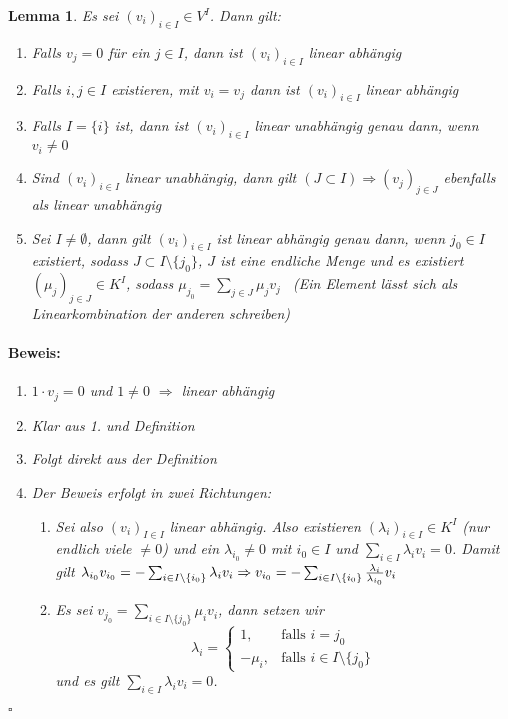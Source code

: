 \documentclass{report}
\newcommand{\lb}{\lambda}
\theoremstyle{customrem}
\theoremstyle{customdef}
\newtheorem{lemma}[definition]{Lemma}
\renewenvironment{proof}{\vspace{-.75cm}\paragraph{Beweis: }}{\vspace{-.5cm}\hfill$\square$}
\begin{document}
	\begin{lemma}
		\label{lem210}
		Es sei $(v_i)_{i \in I} \in V^I$. Dann gilt:
		\begin{enumerate}
			\itemsep.1cm
			\item Falls $v_j = 0$ für ein $j \in I$, dann ist $(v_i)_{i \in I}$ linear abhängig
			\item Falls $i, j \in I$ existieren, mit $v_i = v_j$ dann ist $(v_i)_{i \in I}$ linear abhängig
			\item Falls $I = \{i\}$ ist, dann ist $(v_i)_{i \in I}$ linear unabhängig genau dann, wenn $v_i \neq 0$
			\item Sind $(v_i)_{i \in I}$ linear unabhängig, dann gilt $(J \subset I) \Rightarrow (v_j)_{j \in J}$ ebenfalls als linear unabhängig
			\item Sei $I \neq \emptyset$, dann gilt $(v_i)_{i \in I}$ ist linear abhängig genau dann, wenn $j_0 \in I$ existiert, sodass $J \subset I \setminus \{j_0\}$, $J$ ist eine endliche Menge und es existiert $(\mu_j)_{j \in J} \in K^I$, sodass $\mu_{j_0} = \sum_{j \in J} \mu_j v_j $ \ (Ein Element lässt sich als Linearkombination der anderen schreiben)\\
		\end{enumerate}
		
		\begin{proof}
			\begin{enumerate}
				\itemsep0cm
				\item $1\cdot v_j = 0$ und $1 \neq 0$ $\Rightarrow$ linear abhängig
				\item Klar aus 1. und Definition
				\item Folgt direkt aus der Definition
				\item Der Beweis erfolgt in zwei Richtungen:
				\begin{enumerate}
					\item["`$\Rightarrow$"'] Sei also $(v_i)_{I \in I}$ linear abhängig. Also existieren $(\lb_i)_{i\in I} \in K^I$ (nur endlich viele $\neq 0$) und ein $\lb_{i_0} \neq 0$ mit $i_0 \in I$ und $\sum_{i \in I} \lb_i v_i = 0$.\hspace{1cm} Damit gilt $\lb_{i_0} v_{i_0} = - \sum_{i \in I\setminus\{i_0\}}\lb_i\linebreak v_i	\Rightarrow v_{i_0} = -\sum_{i \in I \setminus \{i_0\}} \frac{\lb_i}{\lb_{i_0}} v_i$
					\item["`$\Leftarrow$"'] 	Es sei $v_{j_0} = \sum_{i \in I \setminus \{j_0\}} \mu_i v_i$, dann setzen wir
					$$\lb_i = \begin{cases}1, & \text{falls } i = j_0\\-\mu_i, & \text{falls } i\in I \setminus \{j_0\}\end{cases}$$
					und es gilt $\sum_{i \in I} \lb_i v_i = 0$.
				\end{enumerate}	
			\end{enumerate}
		\end{proof}
	\end{lemma}
\end{document}
